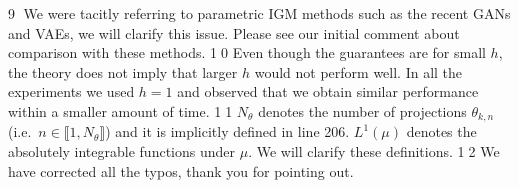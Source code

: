 \documentclass{article}
\newcommand{\rev}[1]{{\color{red} #1}}
\newcommand{\umut}[1]{{\color{blue} #1}}
\newcommand{\alain}[1]{{\color{cyan} #1}}
\newcommand{\antoine}[1]{{\color{orange} #1}}
\newcommand{\ubul}[1]{{\large \color{red} \textcircled{\small #1}}}
\begin{document}
%
%
\ubul{9} We were tacitly referring to parametric IGM methods such as the recent GANs and VAEs, we will clarify this issue. Please see our initial comment about comparison with these methods.  
%
%
\ubul{10} Even though the guarantees are for small $h$, the theory does not imply that larger $h$ would not perform well. In all the experiments we used $h=1$ and observed that we obtain similar performance within a smaller amount of time.    
%
\ubul{11} $N_\theta$ denotes the number of projections $\theta_{k,n}$ (i.e.\ $n \in \llbracket 1, N_\theta \rrbracket$) and it is implicitly defined in line 206. $L^1(\mu)$ denotes the absolutely integrable functions under $\mu$. We will clarify these definitions.
%
%
\ubul{12} We have corrected all the typos, thank you for pointing out.
\end{document}
